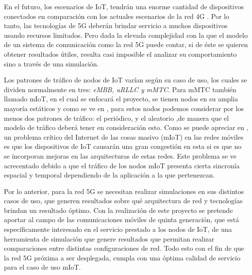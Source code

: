 En el futuro, los escenarios de IoT, tendrán una enorme cantidad de dispositivos conectados en comparación con los actuales escenarios de la red 4G \parencite{Whatis5G}. Por lo tanto, las tecnologías de 5G deberán brindar servicio a muchos dispositivos usando recursos limitados. Pero dada la elevada complejidad con la que el modelo de un sistema de comunicación como la red 5G puede contar, si de éste se quieren obtener resultados útiles, resulta casi imposible el analizar su comportamiento sino a través de una simulación.\newline

Los patrones de tráfico de nodos de IoT varían según su caso de uso, los cuales se dividen normalmente en tres: \textit{eMBB, uRLLC y mMTC}. Para mMTC también llamado mIoT, en el cual se enfocará el proyecto, se tienen nodos en su amplia mayoría estáticos y como se ve en \parencite{IoTTrafficHossfeld}, para estos nodos podemos considerar por los menos dos patrones de tráfico: el periódico, y el aleatorio ,de manera que el modelo de tráfico deberá tener en consideración esto. Como se puede apreciar en \parencite{IoTTrafficHossfeld}, un problema crítico del Internet de las cosas masivo (mIoT) en las redes móviles es que los dispositivos de IoT causarán una gran congestión en esta si es que no se incorporan mejoras en las arquitecturas de estas redes. Este problema se ve acrecentado debido a que el tráfico de los nodos mIoT presenta cierta sincronía espacial y temporal dependiendo de la aplicación a la que pertenezcan.\newline

Por lo anterior, para la red 5G se necesitan realizar simulaciones en sus distintos casos de uso, que generen resultados sobre qué arquitectura de red y tecnologías brindan un resultado óptimo. Con la realización de este proyecto se pretende aportar al campo de las comunicaciones móviles de quinta generación, que está específicamente interesado en el servicio prestado a los nodos de IoT, de una herramienta de simulación que genere resultados que permitan realizar comparaciones entre distintas configuraciones de red. Todo esto con el fin de que la red 5G próxima a ser desplegada, cumpla con una óptima calidad de servicio para el caso de uso mIoT.\newline


